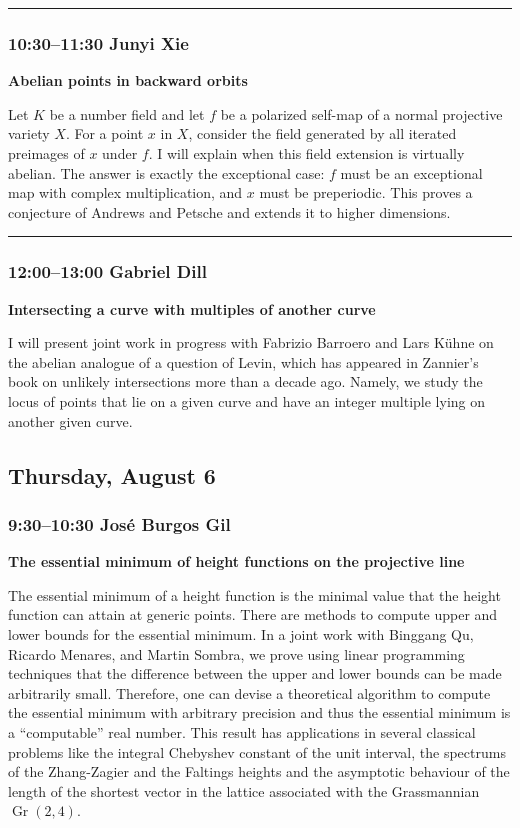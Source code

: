 \documentclass[11pt]{amsart}
\numberwithin{equation}{section}
\begin{document}
\bigskip
\hrule
\bigskip

\subsubsection*{10:30--11:30 \quad Junyi Xie}

\textbf{Abelian points in backward orbits}

Let $K$ be a number field and let $f$ be a polarized self-map of a normal projective variety $X$. For a point $x$ in $X$, consider the field generated by all iterated preimages of $x$ under $f$. I will explain when this field extension is virtually abelian. The answer is exactly the exceptional case: $f$ must be an exceptional map with complex multiplication, and $x$ must be preperiodic. This proves a conjecture of Andrews and Petsche and extends it to higher dimensions.

\bigskip
\hrule
\bigskip

\subsubsection*{12:00--13:00 \quad Gabriel Dill}

\textbf{Intersecting a curve with multiples of another curve}

I will present joint work in progress with Fabrizio Barroero and Lars K\"uhne on the abelian analogue of a question of Levin, which has appeared in Zannier's book on unlikely intersections more than a decade ago. Namely, we study the locus of points that lie on a given curve and have an integer multiple lying on another given curve.

\newpage

\subsection*{Thursday, August 6}

\subsubsection*{9:30--10:30 \quad Jos\'e Burgos Gil}

\textbf{The essential minimum of height functions on the projective line}

The essential minimum of a height function is the minimal value that the height function can attain at generic points. There are methods to compute upper and lower bounds for the essential minimum. In a joint work with Binggang Qu, Ricardo Menares, and Martin Sombra, we prove using linear programming techniques that the difference between the upper and lower bounds can be made arbitrarily small. Therefore, one can devise a theoretical algorithm to compute the essential minimum with arbitrary precision and thus the essential minimum is a ``computable'' real number. This result has applications in several classical problems like the integral Chebyshev constant of the unit interval, the spectrums of the Zhang-Zagier and the Faltings heights and the asymptotic behaviour of the length of the shortest vector in the lattice associated with the Grassmannian $\operatorname{Gr}(2,4)$.
\end{document}
